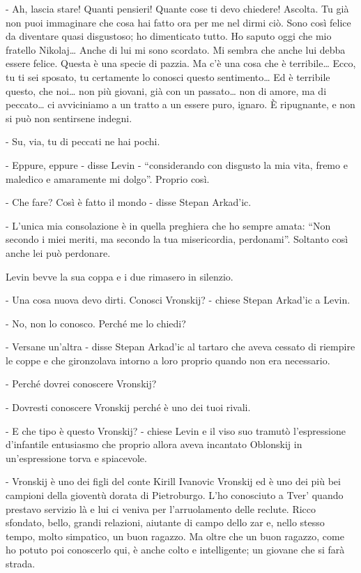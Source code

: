 - Ah, lascia stare! Quanti pensieri! Quante cose ti devo chiedere! Ascolta. Tu già non puoi immaginare che cosa hai fatto ora per me nel dirmi ciò. Sono così felice da diventare quasi disgustoso; ho dimenticato tutto. Ho saputo oggi che mio fratello Nikolaj\ldots{} Anche di lui mi sono scordato. Mi sembra che anche lui debba essere felice. Questa è una specie di pazzia. Ma c'è una cosa che è terribile\ldots{} Ecco, tu ti sei sposato, tu certamente lo conosci questo sentimento\ldots{} Ed è terribile questo, che noi\ldots{} non più giovani, già con un passato\ldots{} non di amore, ma di peccato\ldots{} ci avviciniamo a un tratto a un essere puro, ignaro. È ripugnante, e non si può non sentirsene indegni. 

- Su, via, tu di peccati ne hai pochi. 

- Eppure, eppure - disse Levin - ``considerando con disgusto la mia vita, fremo e maledico e amaramente mi dolgo''. Proprio così. 

- Che fare? Così è fatto il mondo - disse Stepan Arkad'ic. 

- L'unica mia consolazione è in quella preghiera che ho sempre amata: ``Non secondo i miei meriti, ma secondo la tua misericordia, perdonami''. Soltanto così anche lei può perdonare. 

\label{xi} 

Levin bevve la sua coppa e i due rimasero in silenzio. 

- Una cosa nuova devo dirti. Conosci Vronskij? - chiese Stepan Arkad'ic a Levin. 

- No, non lo conosco. Perché me lo chiedi? 

- Versane un'altra - disse Stepan Arkad'ic al tartaro che aveva cessato di riempire le coppe e che gironzolava intorno a loro proprio quando non era necessario. 

- Perché dovrei conoscere Vronskij? 

- Dovresti conoscere Vronskij perché è uno dei tuoi rivali. 

- E che tipo è questo Vronskij? - chiese Levin e il viso suo tramutò l'espressione d'infantile entusiasmo che proprio allora aveva incantato Oblonskij in un'espressione torva e spiacevole. 

- Vronskij è uno dei figli del conte Kirill Ivanovic Vronskij ed è uno dei più bei campioni della gioventù dorata di Pietroburgo. L'ho conosciuto a Tver' quando prestavo servizio là e lui ci veniva per l'arruolamento delle reclute. Ricco sfondato, bello, grandi relazioni, aiutante di campo dello zar e, nello stesso tempo, molto simpatico, un buon ragazzo. Ma oltre che un buon ragazzo, come ho potuto poi conoscerlo qui, è anche colto e intelligente; un giovane che si farà strada. 

